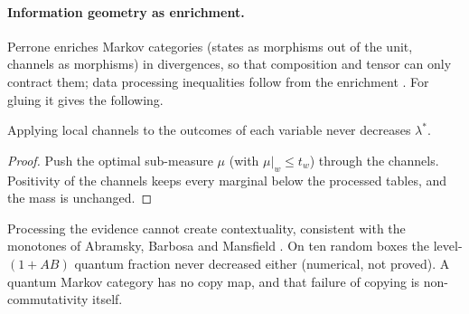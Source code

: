 \documentclass[11pt]{article}
\theoremstyle{definition}\newtheorem{definition}[theorem]{Definition}\newtheorem{remark}[theorem]{Remark}\newtheorem{example}[theorem]{Example}
\begin{document}
\paragraph{Information geometry as enrichment.}
Perrone enriches Markov categories (states as morphisms out of the unit, channels as morphisms) in divergences, so that composition and tensor
can only contract them; data processing inequalities follow from the enrichment \cite{Perrone2023,Fritz2020}. For gluing it gives the following.

\begin{proposition}\label{prop:dpi}
Applying local channels to the outcomes of each variable never decreases $\lambda^*$.
\end{proposition}

\begin{proof}
Push the optimal sub-measure $\mu$ (with $\mu|_w\le t_w$) through the channels. Positivity of the channels keeps every marginal below the
processed tables, and the mass is unchanged.
\end{proof}

Processing the evidence cannot create contextuality, consistent with the monotones of Abramsky, Barbosa and Mansfield
\cite{AbramskyBarbosaMansfield2017}. On ten random boxes the level-$(1{+}AB)$ quantum fraction never decreased either (numerical, not
proved). A quantum Markov category has no copy map, and that failure of copying is non-commutativity itself.
\end{document}
